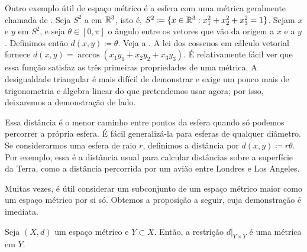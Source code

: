 \begin{example}
Outro exemplo útil de espaço métrico é a esfera com uma métrica geralmente
chamada de \emph{}.
Seja $S^2$ a  em ${\mathbb{R}}^3$, isto é,
$S^2 \coloneqq \{ x \in {\mathbb{R}}^3 : x_1^2+x_2^2+x_3^2 = 1 \}$.
Sejam $x$ e $y$ em $S^2$, e seja $\theta \in [0,\pi]$ o ângulo entre os vetores que vão da origem a $x$ e a $y$.
Definimos então $d(x,y) \coloneqq \theta$. Veja a
.
A lei dos cossenos em cálculo vetorial fornece
$d(x,y) = \arccos(x_1y_1+x_2y_2+x_3y_3)$.
É relativamente fácil ver que essa função satisfaz as três primeiras
propriedades de uma métrica.
A desigualdade triangular é mais difícil de demonstrar e exige um pouco mais
de trigonometria e álgebra linear do que pretendemos usar agora; por isso,
deixaremos a demonstração de lado.

\begin{myfigureht}
\caption{Distância ortodrômica na esfera
unitária.\label{fig:spheremetric}}
\end{myfigureht}

Essa distância é o menor caminho entre pontos da esfera quando só podemos
percorrer a própria esfera. É fácil generalizá-la para esferas de qualquer
diâmetro. Se considerarmos uma esfera de raio $r$, definimos a distância por
$d(x,y) \coloneqq r \theta$. Por exemplo, essa é a distância usual para
calcular distâncias sobre a superfície da Terra, como a distância percorrida
por um avião entre Londres e Los Angeles.
\end{example}

Muitas vezes, é útil considerar um subconjunto de um espaço métrico maior
como um espaço métrico por si só. Obtemos a proposição a seguir, cuja
demonstração é imediata.

\begin{prop}
Seja $(X,d)$ um espaço métrico e $Y \subset X$. Então, a restrição
$d|_{Y \times Y}$ é uma métrica em $Y$.
\end{prop}


